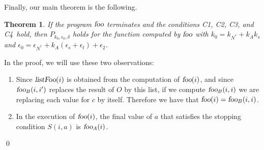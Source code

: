 \documentclass[copyright,creativecommons]{eptcs}
\newtheorem{theorem}{Theorem}[section]
\newcommand{\foo}{\hbox{\sl foo}}
\newcommand{\fooA}{\hbox{\sl foo}_A}
\newcommand{\fooB}{\hbox{\sl foo}_B}
\newcommand{\ListFoo}{\hbox{\sl listFoo}}
\newcommand{\Cone}{C1}
\newcommand{\Ctwo}{C2}
\newcommand{\Cthree}{C3}
\newcommand{\Cfour}{C4}
\newcommand{\Kn}{k_{N^*}}
\newcommand{\En}{\epsilon_{N^*}}
\renewenvironment{proof}{\noindent {\bf Proof}\quad}{\qed}
\begin{document}
Finally, our main theorem is the following.
\begin{theorem}
If the program $\foo$ terminates and the conditions \Cone, \Ctwo,
\Cthree, and \Cfour\ hold, then $P_{k_0,\epsilon_0,\delta}$ holds for
the function computed by $\foo$ with $k_0= \Kn + k_A k_s $ and
$\epsilon_0= \En + k_A (\epsilon_s + \epsilon_t) + \epsilon_2$.
\end{theorem}


\begin{proof}
In the proof, we will use these two observations:
\begin{enumerate}
\item \label{O2} Since $\ListFoo(i)$ is obtained from the computation of
  $\foo(i)$, and since $\fooB(i,i')$ replaces the result of $O$ by this
  list, if we compute $\fooB(i,i)$ we are replacing each value for $c$
  by itself. Therefore we have that $\foo(i) = \fooB(i,i)$. 



\item \label{O5} In the execution of $\foo(i)$, the final value of $a$
  that satisfies the stopping condition $S(i,a)$ is $\fooA(i)$. 
\end{enumerate}


\end{proof}
\end{document}
